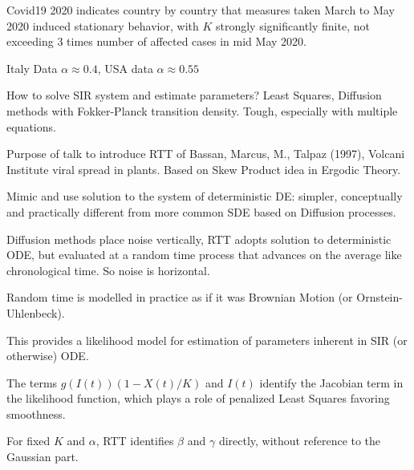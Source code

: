 \documentclass{article}
\begin{document}
\newpage

\noindent Covid19 2020 indicates country by country that \linebreak measures taken March to May 2020 induced stationary behavior, with $K$ strongly significantly finite, not exceeding $3$ times number of affected cases in mid May 2020.

\bigskip

\noindent Italy Data $\alpha \approx 0.4$, USA data $\alpha \approx 0.55$ 


\newpage

\noindent How to solve SIR system and estimate parameters? Least Squares, Diffusion methods with Fokker-Planck transition density. Tough, especially with multiple equations.

\bigskip

\noindent Purpose of talk to introduce RTT of Bassan, Marcus, M., Talpaz (1997), Volcani Institute viral spread in plants. Based on Skew Product idea in Ergodic Theory.

\newpage


\bigskip

\noindent Mimic and use solution to the system of deterministic DE: simpler, conceptually and practically different from more common SDE based on Diffusion processes.

\bigskip

\noindent Diffusion methods place noise vertically, RTT adopts solution to deterministic ODE, but evaluated at a random time process that advances on the average like chronological time. So noise is horizontal. 

\newpage

\noindent Random time is modelled in practice as if it was Brownian Motion (or Ornstein-Uhlenbeck). 

\bigskip

\noindent This provides a likelihood model for estimation of parameters inherent in SIR (or otherwise) ODE. 

\bigskip

\noindent The terms $g(I(t)) (1 - X(t)/K)$ and $I(t)$ identify the Jacobian term in the likelihood function, which plays a role of penalized Least Squares favoring \linebreak smoothness.

\newpage

\noindent For fixed $K$ and $\alpha$, RTT identifies $\beta$ and $\gamma$ directly, without reference to the Gaussian part. 
\end{document}
